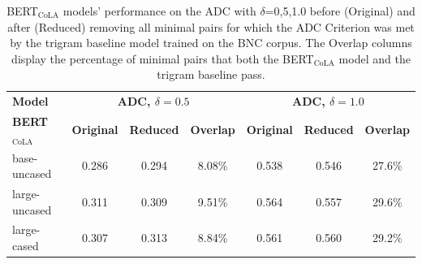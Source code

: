 
\begin{table}[h]
    \centering
    \begin{tabular}{@{}lcccccc@{}}
    \toprule
    \textbf{Model} & \multicolumn{3}{c}{\textbf{ADC, $\delta=0.5$}} &  \multicolumn{3}{c}{\textbf{ADC, $\delta=1.0$}} \\
    \cmidrule{2-3} \cmidrule{4-7}
    \textbf{BERT$_\mathrm{CoLA}$} & \textbf{Original} & \textbf{Reduced} & \textbf{Overlap} & \textbf{Original} & \textbf{Reduced} & \textbf{Overlap} \\
    \midrule
    base-uncased & 0.286 & 0.294 & 8.08\% & 0.538 & 0.546 & 27.6\%\\
    large-uncased & 0.311 & 0.309 & 9.51\% & 0.564 & 0.557 & 29.6\%\\
    large-cased & 0.307 & 0.313 & 8.84\% &  0.561 & 0.560 & 29.2\% \\
    \bottomrule
    \end{tabular}
    \caption[BERT$_\mathrm{CoLA}$ ADC with $\delta=$\{0.5,1.0\} scores \newline sans easy min pairs]{BERT$_\mathrm{CoLA}$ models' performance on the ADC with $\delta$={0,5,1.0} before (Original) and after (Reduced) removing all minimal pairs for which the ADC Criterion was met by the trigram baseline model trained on the BNC corpus. The Overlap columns display the percentage of minimal pairs that both the BERT$_\mathrm{CoLA}$ model and the trigram baseline pass.}
    \label{tab:table_11}
\end{table}

